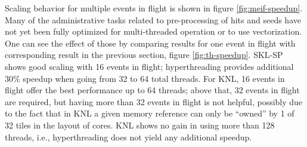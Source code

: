 \documentclass{webofc}
\begin{document}
Scaling behavior for multiple events in flight is shown in figure
\ref{fig:meif-speedup}. Many of the administrative tasks related to
pre-processing of hits and seeds have not yet been fully optimized for
multi-threaded operation or to use vectorization. One can see the effect of
those by comparing results for one event in flight with corresponding result in
the previous section, figure \ref{fig:th-speedup}. SKL-SP shows good scaling with 16
events in flight; hyperthreading provides additional 30\% speedup when going from 32 to 64
total threads. For KNL, 16 events in flight offer the best performance up to
64 threads; above that, 32 events in flight are required, but having more than
32 events in flight is not helpful, possibly due to the fact that in KNL a given
memory reference can only be ``owned'' by 1 of 32 tiles in the layout of cores.
KNL shows no gain in using more than 128 threads, i.e., hyperthreading does not
yield any additional speedup.
\end{document}
